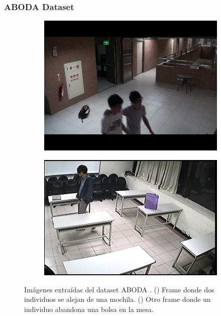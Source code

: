 \subsubsection{ABODA Dataset}

\begin{figure}[ht]
  \centering
  \begin{subfigure}[b]{0.4\textwidth}
    \includegraphics[width=\textwidth]{img/chapters/resultados/bases-datos/aboda_1.jpg}
    \caption{}
    \label{fig:aboda_1}
  \end{subfigure}
  \qquad\qquad
  \begin{subfigure}[b]{0.4\textwidth}
    \includegraphics[width=\textwidth]{img/chapters/resultados/bases-datos/aboda_2.jpg}
    \caption{}
    \label{fig:aboda_2}
  \end{subfigure}
  \caption{Imágenes extraídas del dataset ABODA \cite{aboda-dataset}.
    (\protect{}) Frame donde dos individuos se alejan de una mochila.
    (\protect{}) Otro frame donde un individuo abandona una bolsa en la mesa.}
  \label{fig:aboda}
\end{figure}

